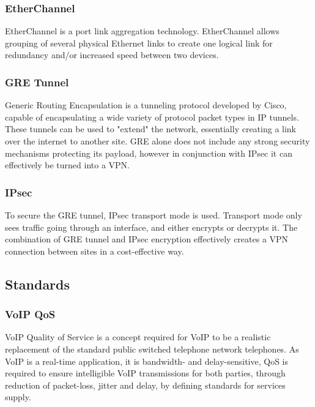 \subsubsection{EtherChannel}
EtherChannel is a port link aggregation technology. EtherChannel allows grouping of several physical Ethernet links to create one logical link for redundancy and/or increased speed between two devices. \cite{EtherChannel}

\subsubsection{GRE Tunnel}
Generic Routing Encapsulation is a tunneling protocol developed by Cisco, capable of encapsulating a wide variety of protocol packet types in IP tunnels. \cite{CCNP-ROUTE}
These tunnels can be used to "extend" the network, essentially creating a link over the internet to another site.
GRE alone does not include any strong security mechanisms protecting its payload, however in conjunction with IPsec it can effectively be turned into a VPN.

\subsubsection{IPsec}
To secure the GRE tunnel, IPsec transport mode is used.
Transport mode only sees traffic going through an interface, and either encrypts or decrypts it. 
The combination of GRE tunnel and IPsec encryption effectively creates a VPN connection between sites in a cost-effective way.

\subsection{Standards}

\subsubsection{VoIP QoS}
VoIP Quality of Service is a concept required for VoIP to be a realistic replacement of the standard public switched telephone network telephones.
As VoIP is a real-time application, it is bandwidth- and delay-sensitive, QoS is required to ensure intelligible VoIP transmissions for both parties, through reduction of packet-loss, jitter and delay, by defining standards for services supply. \cite{VoIP-QoS}
